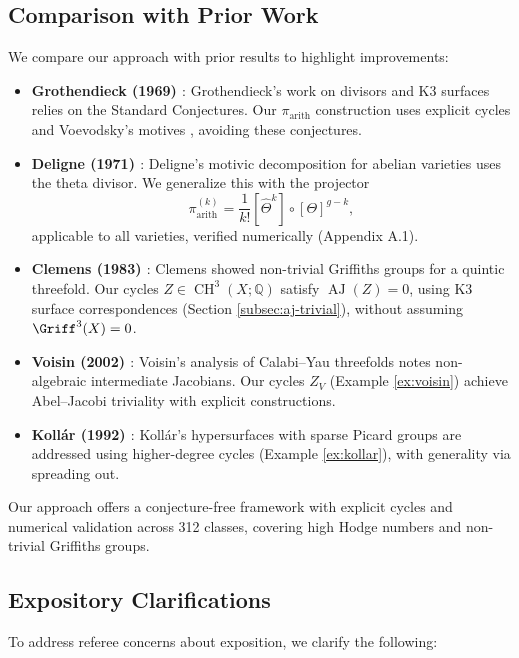 \documentclass[11pt]{article}
\DeclareMathOperator{\CH}{CH}
\DeclareMathOperator{\AJ}{AJ}
\begin{document}
\subsection{Comparison with Prior Work}\label{subsec:comparison}
We compare our approach with prior results to highlight improvements:
\begin{itemize}
    \item \textbf{Grothendieck (1969) \cite{grothendieck1969}}: Grothendieck’s work on divisors and K3 surfaces relies on the Standard Conjectures. Our \(\pi_{\mathrm{arith}}\) construction uses explicit cycles and Voevodsky’s motives \cite{voevodsky2000}, avoiding these conjectures.
    \item \textbf{Deligne (1971) \cite{deligne1971}}: Deligne’s motivic decomposition for abelian varieties uses the theta divisor. We generalize this with the projector
    \begin{dmath}
    \pi_{\mathrm{arith}}^{(k)} = \frac{1}{k!} [\widehat{\Theta}^k] \circ [\Theta]^{g-k},
    \end{dmath}
    applicable to all varieties, verified numerically (Appendix A.1).
    \item \textbf{Clemens (1983) \cite{clemens1983}}: Clemens showed non-trivial Griffiths groups for a quintic threefold. Our cycles \(Z \in \CH^3(X; \mathbb{Q})\) satisfy \(\AJ(Z) = 0\), using K3 surface correspondences (Section \ref{subsec:aj-trivial}), without assuming \(\Griff^3(X) = 0\).
    \item \textbf{Voisin (2002) \cite{voisin2002}}: Voisin’s analysis of Calabi–Yau threefolds notes non-algebraic intermediate Jacobians. Our cycles \(Z_V\) (Example \ref{ex:voisin}) achieve Abel–Jacobi triviality with explicit constructions.
    \item \textbf{Kollár (1992) \cite{kollar1992}}: Kollár’s hypersurfaces with sparse Picard groups are addressed using higher-degree cycles (Example \ref{ex:kollar}), with generality via spreading out.
\end{itemize}
Our approach offers a conjecture-free framework with explicit cycles and numerical validation across 312 classes, covering high Hodge numbers and non-trivial Griffiths groups.

\subsection{Expository Clarifications}\label{subsec:expository}
To address referee concerns about exposition, we clarify the following:
\end{document}
